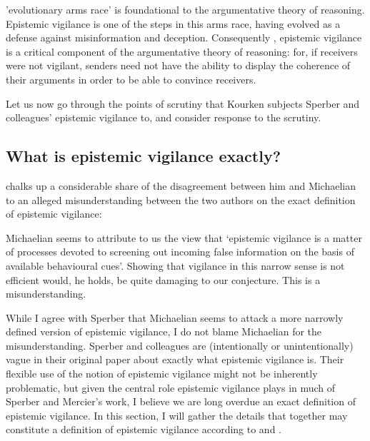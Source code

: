  'evolutionary arms race' is foundational to the argumentative theory of reasoning. Epistemic vigilance is one of the steps in this arms race, having evolved as a defense against misinformation and deception. Consequently , epistemic vigilance is a critical component of the argumentative theory of reasoning: for, if receivers were not vigilant, senders need not have the ability to display the coherence of their arguments in order to be able to convince receivers.

 Let us now go through the points of scrutiny that Kourken \citet{Michaelian13} subjects Sperber and colleagues' epistemic vigilance to, and consider  response to the scrutiny.

\subsection{What is epistemic vigilance exactly?}


\citet{Sperber13} chalks up a considerable share of the disagreement between him and Michaelian to an alleged misunderstanding between the two authors on the exact definition of epistemic vigilance:
\begin{quoting}
    Michaelian seems to attribute to us the view that ‘epistemic vigilance is a matter of processes devoted to screening out incoming false information on the basis of available behavioural cues’. Showing that vigilance in this narrow sense is not efficient would, he holds, be quite damaging to our conjecture. This is a misunderstanding.
    \hfill \citep[p.~65]{Sperber13}
\end{quoting}
While I agree with Sperber that Michaelian seems to attack a more narrowly defined version of epistemic vigilance, I do not blame Michaelian for the misunderstanding. Sperber and colleagues are (intentionally or unintentionally) vague in their original paper about exactly what epistemic vigilance is.
Their flexible use of the notion of epistemic vigilance might not be inherently problematic, but given the central role epistemic vigilance plays in much of Sperber and Mercier's work, I believe we are long overdue an exact definition of epistemic vigilance. In this section, I will gather the details that together may constitute a definition of epistemic vigilance according to \citet{Sperber10} and \citet{Sperber13}.

